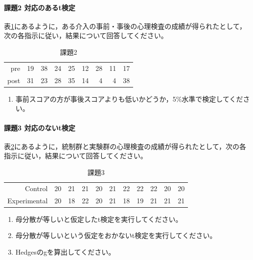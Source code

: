 \documentclass{ltjsbook}
\begin{document}
\paragraph{課題2 対応のあるt検定}
表\ref{exe:20_2}にあるように，ある介入の事前・事後の心理検査の成績が得られたとして，次の各指示に従い，結果について回答してください。
\begin{table}[ht]
    \centering
    \caption{課題2}
    \label{exe:20_2}
    \begin{tabular}{rrrrrrrrr}
      \hline
    pre & 19 & 38 & 24 & 25 & 12 & 28 & 11 & 17 \\ 
      post & 31 & 23 & 28 & 35 & 14 & 4 & 4 & 38 \\ 
       \hline
    \end{tabular}
\end{table}

\begin{enumerate}
    \item 事前スコアの方が事後スコアよりも低いかどうか，5\%水準で検定してください。
\end{enumerate}

\paragraph{課題3 対応のないt検定}
表\ref{exe:20_3}にあるように，統制群と実験群の心理検査の成績が得られたとして，次の各指示に従い，結果について回答してください。
\begin{table}[ht]
\centering
    \caption{課題3}
    \label{exe:20_3}
    \begin{tabular}{rrrrrrrrrrr}
  \hline
    Control & 20 & 21 & 21 & 20 & 21 & 22 & 22 & 22 & 20 & 20 \\ 
  Experimental & 20 & 18 & 22 & 20 & 21 & 18 & 19 & 21 & 21 & 21 \\ 
   \hline
\end{tabular}
\end{table}

\begin{enumerate}
     \item 母分散が等しいと仮定したt検定を実行してください。
     \item 母分散が等しいという仮定をおかないt検定を実行してください。
     \item Hedgesのgを算出してください。
\end{enumerate}
\end{document}
